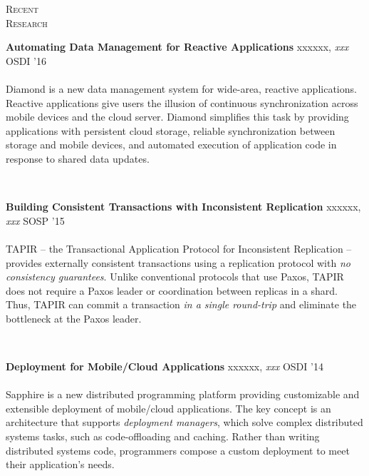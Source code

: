 \documentclass[10pt,times]{report}
\newlength{\sectiongap}
\newlength{\entrygap}
\newlength{\sectioncolwidth}
\newlength{\colgap}
\newlength{\stuffwidth}
\def\ifEqString#1#2{\def\testa{#1}\def\testb{#2}%
  \ifx\testa\testb}
\newenvironment{rtable}{
  \begin{minipage}{\textwidth}
  }{
  \end{minipage}
}
\newenvironment{rentry}[3][xxx]{
  \begin{minipage}[t]{\hsize}
    \textbf{#2}\ifEqString{#1}{xxx}\relax\else, \textit{#1}\fi
    \hspace{\stretch{1}} #3 \\
  }{
    \removelastskip
  \end{minipage}
  \\[\entrygap]  %
}
\newenvironment{rsection}[1]{
  \begin{minipage}[t]{\sectioncolwidth}
    \textsc{#1}
  \end{minipage}
  \hspace{\colgap}
  \begin{minipage}[t]{\stuffwidth}
  }{
    \removelastskip
  \end{minipage}
  \\[\sectiongap]
}
\begin{document}
\begin{rtable}
  \begin{rsection}{Recent\\Research}
    \begin{rentry}{Automating Data Management for Reactive
        Applications}{OSDI '16}
      \vspace{-.5em}\\
      Diamond is a new data management system for wide-area, reactive
      applications. Reactive applications give users the illusion of
      continuous synchronization across mobile devices and the cloud
      server. Diamond simplifies this task by providing applications
      with persistent cloud storage, reliable synchronization between
      storage and mobile devices, and automated execution of
      application code in response to shared data updates.
    \end{rentry}\vspace{1em}

    \begin{rentry}{Building Consistent Transactions with Inconsistent
        Replication}{SOSP '15}
      \vspace{-.5em}\\
      TAPIR -- the Transactional Application Protocol for Inconsistent
      Replication -- provides externally consistent transactions using a
      replication protocol with \emph{no consistency guarantees}.
      Unlike conventional protocols that use Paxos, TAPIR does not
      require a Paxos leader or coordination between replicas in a
      shard. Thus, TAPIR can commit a transaction \emph{in a single
        round-trip} and eliminate the bottleneck at the Paxos leader.
    \end{rentry}\vspace{1em}

    \begin{rentry}{Deployment for Mobile/Cloud Applications}{OSDI '14}
      \vspace{-.5em}\\
      Sapphire is a new distributed programming platform providing
      customizable and extensible deployment of mobile/cloud
      applications. The key concept is an architecture that supports
      \emph{deployment managers}, which solve complex distributed
      systems tasks, such as code-offloading and caching. Rather than
      writing distributed systems code, programmers compose a custom
      deployment to meet their application's needs.
    \end{rentry}\vspace{1em}


\end{rsection}
\end{rtable}
\end{document}
